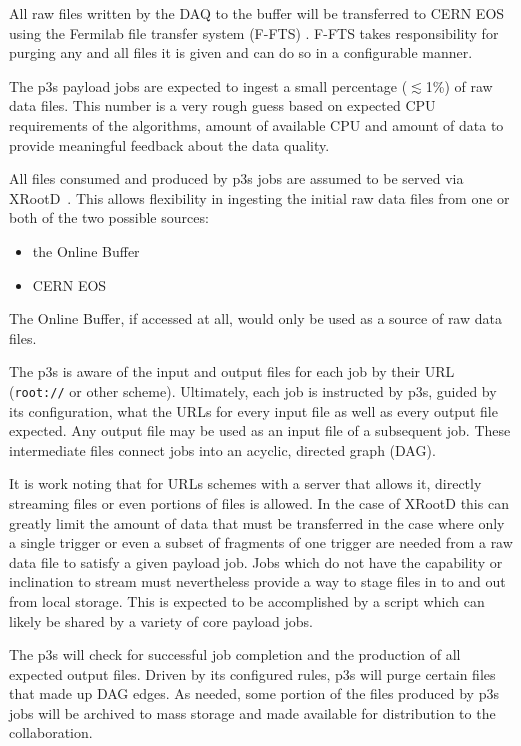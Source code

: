 \documentclass[pdftex,12pt,letter]{article}
\begin{document}
All raw files written by the DAQ to the buffer will be transferred to
CERN EOS using the Fermilab file transfer system (F-FTS)
\cite{docdb1212,fts}.  F-FTS takes responsibility for purging any and
all files it is given and can do so in a configurable manner.

The p3s payload jobs are expected to ingest a small percentage
($\lesssim$1\%) of raw data files.  This number is a very rough guess
based on expected CPU requirements of the algorithms, amount of
available CPU and amount of data to provide meaningful feedback about
the data quality.

All files consumed and produced by p3s jobs are assumed to be served
via XRootD~\cite{xrootd}.  This allows flexibility in ingesting the
initial raw data files from one or both of the two possible sources:
\begin{itemize}
\item the Online Buffer
\item CERN EOS~\cite{eos}
\end{itemize}
The Online Buffer, if accessed at all, would only be used as a source
of raw data files.  

The p3s is aware of the input and output files for each job by their
URL (\texttt{root://} or other scheme).  Ultimately, each job is
instructed by p3s, guided by its configuration, what the URLs for
every input file as well as every output file expected.  Any output
file may be used as an input file of a subsequent job.  These
intermediate files connect jobs into an acyclic, directed graph (DAG).

It is work noting that for URLs schemes with a server that allows it,
directly streaming files or even portions of files is allowed.  In the
case of XRootD this can greatly limit the amount of data that must be
transferred in the case where only a single trigger or even a subset
of fragments of one trigger are needed from a raw data file to satisfy
a given payload job.  Jobs which do not have the capability or
inclination to stream must nevertheless provide a way to stage files
in to and out from local storage.  This is expected to be accomplished
by a script which can likely be shared by a variety of core payload
jobs.

The p3s will check for successful job completion and the production of
all expected output files.  Driven by its configured rules, p3s will
purge certain files that made up DAG edges.
As needed, some portion of the files produced by p3s jobs will be
archived to mass storage and made available for distribution to the
collaboration.
\end{document}
